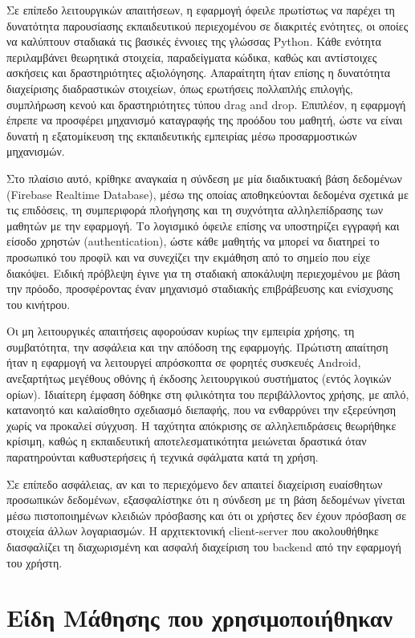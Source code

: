 \documentclass[11pt]{report}
\begin{document}
Σε επίπεδο λειτουργικών απαιτήσεων, η εφαρμογή όφειλε πρωτίστως να παρέχει τη δυνατότητα παρουσίασης εκπαιδευτικού περιεχομένου σε διακριτές ενότητες, οι οποίες να καλύπτουν σταδιακά τις βασικές έννοιες της γλώσσας Python. Κάθε ενότητα περιλαμβάνει θεωρητικά στοιχεία, παραδείγματα κώδικα, καθώς και αντίστοιχες ασκήσεις και δραστηριότητες αξιολόγησης. Απαραίτητη ήταν επίσης η δυνατότητα διαχείρισης διαδραστικών στοιχείων, όπως ερωτήσεις πολλαπλής επιλογής, συμπλήρωση κενού και δραστηριότητες τύπου drag and drop. Επιπλέον, η εφαρμογή έπρεπε να προσφέρει μηχανισμό καταγραφής της προόδου του μαθητή, ώστε να είναι δυνατή η εξατομίκευση της εκπαιδευτικής εμπειρίας μέσω προσαρμοστικών μηχανισμών. 

Στο πλαίσιο αυτό, κρίθηκε αναγκαία η σύνδεση με μία διαδικτυακή βάση δεδομένων (Firebase Realtime Database), μέσω της οποίας αποθηκεύονται δεδομένα σχετικά με τις επιδόσεις, τη συμπεριφορά πλοήγησης και τη συχνότητα αλληλεπίδρασης των μαθητών με την εφαρμογή. Το λογισμικό όφειλε επίσης να υποστηρίζει εγγραφή και είσοδο χρηστών (authentication), ώστε κάθε μαθητής να μπορεί να διατηρεί το προσωπικό του προφίλ και να συνεχίζει την εκμάθηση από το σημείο που είχε διακόψει. Ειδική πρόβλεψη έγινε για τη σταδιακή αποκάλυψη περιεχομένου με βάση την πρόοδο, προσφέροντας έναν μηχανισμό σταδιακής επιβράβευσης και ενίσχυσης του κινήτρου. 

Οι μη λειτουργικές απαιτήσεις αφορούσαν κυρίως την εμπειρία χρήσης, τη συμβατότητα, την ασφάλεια και την απόδοση της εφαρμογής. Πρώτιστη απαίτηση ήταν η εφαρμογή να λειτουργεί απρόσκοπτα σε φορητές συσκευές Android, ανεξαρτήτως μεγέθους οθόνης ή έκδοσης λειτουργικού συστήματος (εντός λογικών ορίων). Ιδιαίτερη έμφαση δόθηκε στη φιλικότητα του περιβάλλοντος χρήσης, με απλό, κατανοητό και καλαίσθητο σχεδιασμό διεπαφής, που να ενθαρρύνει την εξερεύνηση χωρίς να προκαλεί σύγχυση. Η ταχύτητα απόκρισης σε αλληλεπιδράσεις θεωρήθηκε κρίσιμη, καθώς η εκπαιδευτική αποτελεσματικότητα μειώνεται δραστικά όταν παρατηρούνται καθυστερήσεις ή τεχνικά σφάλματα κατά τη χρήση. 

Σε επίπεδο ασφάλειας, αν και το περιεχόμενο δεν απαιτεί διαχείριση ευαίσθητων προσωπικών δεδομένων, εξασφαλίστηκε ότι η σύνδεση με τη βάση δεδομένων γίνεται μέσω πιστοποιημένων κλειδιών πρόσβασης και ότι οι χρήστες δεν έχουν πρόσβαση σε στοιχεία άλλων λογαριασμών. Η αρχιτεκτονική client-server που ακολουθήθηκε διασφαλίζει τη διαχωρισμένη και ασφαλή διαχείριση του backend από την εφαρμογή του χρήστη. 

 
\section{Είδη Μάθησης που χρησιμοποιήθηκαν}
\end{document}
